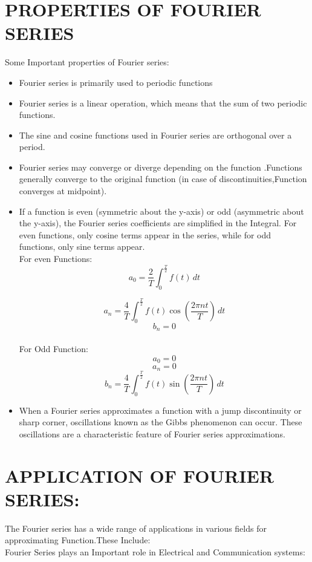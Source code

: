 \documentclass{article}
\begin{document}
\section{PROPERTIES OF FOURIER SERIES}
Some Important properties of Fourier series:
\begin{itemize}
\item Fourier series is primarily used to periodic functions
\item Fourier series is a linear operation, which means that the sum of two periodic functions.
\item The sine and cosine functions used in Fourier series are orthogonal over a period. 
\item  Fourier series may converge or diverge depending on the  function .Functions generally converge to the original function (in case of discontinuities,Function converges at midpoint). 
\item If a function is even (symmetric about the y-axis) or odd (asymmetric about the y-axis), the Fourier series coefficients are simplified in the Integral. For even functions, only cosine terms appear in the series, while for odd functions, only sine terms appear.\\
For even Functions:\\
\[ a_0 = \frac{2}{T} \int_{0}^{\frac{T}{2}} f(t) \, dt \]

\[ a_n = \frac{4}{T} \int_{0}^{\frac{T}{2}} f(t) \cos\left(\frac{2\pi n t}{T}\right) \, dt \]
\[ b_n = 0 \]\\
For Odd Function:\\
\[ a_0 = 0 \]
\[ a_n = 0 \]
\[ b_n = \frac{4}{T} \int_{0}^{\frac{T}{2}} f(t) \sin\left(\frac{2\pi n t}{T}\right) \, dt \]

 \item When a Fourier series approximates a function with a jump discontinuity or sharp corner, oscillations known as the Gibbs phenomenon can occur. These oscillations are a characteristic feature of Fourier series approximations.
 \end{itemize}

\section{APPLICATION OF FOURIER SERIES:}
The Fourier series has a wide range of applications in various fields for approximating Function.These Include:\\
 Fourier Series plays an Important role in Electrical and Communication systems:
\end{document}
